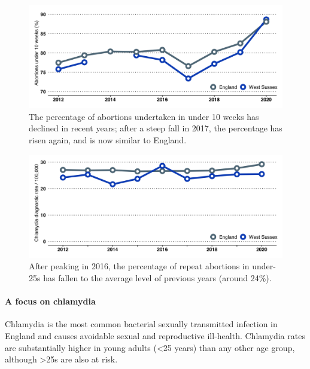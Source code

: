 \begin{figure}[ht]
    \caption{The percentage of abortions undertaken in under 10 weeks has declined in recent years; after a steep fall in 2017, the percentage has risen again, and is now similar to England.}\label{fig:ab_u10wks}
    \centering
    \includegraphics[width = \linewidth]{images/abortions_lt_10wks_line.png}
\end{figure}

\begin{figure}[H]
    \caption{After peaking in 2016, the percentage of repeat abortions in under-25s has fallen to the average level of previous years (around 24\%).}\label{fig:repeat_ab}
    \centering
    \includegraphics[width = \linewidth]{images/repeat_abortions_line.png}
\end{figure}

\paragraph{A focus on chlamydia} Chlamydia is the most common bacterial sexually transmitted infection in England and causes avoidable sexual and reproductive ill-health. Chlamydia rates are substantially higher in young adults (<25 years) than any other age group, although >25s are also at risk. 

